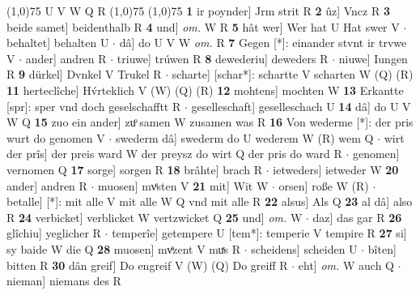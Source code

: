 \documentclass[8pt,a4paper,notitlepage]{article}
\begin{document}
\begin{table}[ht]
\begin{minipage}[t]{0.5\linewidth}
\line(1,0){75} \newline
U V W Q R \newline
\line(1,0){75} \newline
\newline
\line(1,0){75} \newline
\textbf{1} ir poynder] Jrm strit R \textbf{2} ûz] Vncz R \textbf{3} beide samet] beidenthalb R \textbf{4} und] \textit{om.} W R \textbf{5} hât wer] Wer hat U Hat swer V  $\cdot$ behaltet] behalten U  $\cdot$ dâ] do U V W \textit{om.} R \textbf{7} Gegen [*]: einander stvnt ir trvwe V  $\cdot$ ander] andren R  $\cdot$ triuwe] trúwen R \textbf{8} dewederiu] deweders R  $\cdot$ niuwe] Iungen R \textbf{9} dürkel] Dvnkel V Trukel R  $\cdot$ scharte] [schar*]: schartte V scharten W (Q) (R) \textbf{11} herteclîche] Hv́rteklich V (W) (Q) (R) \textbf{12} mohtens] mochten W \textbf{13} Erkantte [spr]: sper vnd doch geselschafftt R  $\cdot$ geselleschaft] geselleschach U \textbf{14} dâ] do U V W Q \textbf{15} zuo ein ander] zuͦ samen W zusamen was R \textbf{16} Von wederme [*]: der pris wurt do genomen V  $\cdot$ swederm dâ] swederm do U wederem W (R) wem Q  $\cdot$ wirt der prîs] der preis ward W der preysz do wirt Q der pris do ward R  $\cdot$ genomen] vernomen Q \textbf{17} sorge] sorgen R \textbf{18} brâhte] brach R  $\cdot$ ietweders] ietweder W \textbf{20} ander] andren R  $\cdot$ muosen] mvͤsten V \textbf{21} mit] Wit W  $\cdot$ orsen] roße W (R)  $\cdot$ betalle] [*]: mit alle V mit alle W Q vnd mit alle R \textbf{22} alsus] Als Q \textbf{23} al dâ] also R \textbf{24} verbicket] verblicket W vertzwicket Q \textbf{25} und] \textit{om.} W  $\cdot$ daz] das gar R \textbf{26} glîchiu] yeglicher R  $\cdot$ temperîe] getempere U [tem*]: temperie V tempire R \textbf{27} si] sy baide W die Q \textbf{28} muosen] mvͤzent V muͯs R  $\cdot$ scheidens] scheiden U  $\cdot$ bîten] bitten R \textbf{30} dân greif] Do engreif V (W) (Q) Do greiff R  $\cdot$ eht] \textit{om.} W auch Q  $\cdot$ nieman] niemans des R \newline
\end{minipage}
\end{table}
\end{document}
